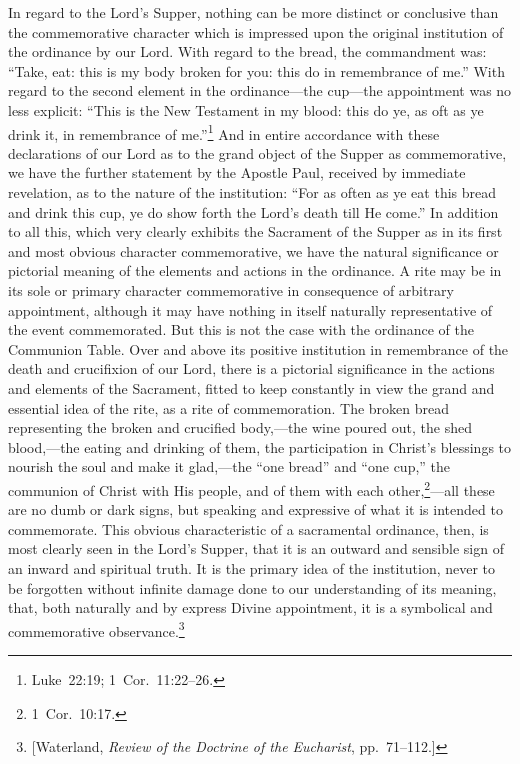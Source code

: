 \documentclass[
  english,
]{book}
\begin{document}
In regard to the Lord's Supper, nothing can be more distinct or conclusive than the commemorative character which is impressed upon the original institution of the ordinance by our Lord. With regard to the bread, the commandment was: ``Take, eat: this is my body broken for you: this do in remembrance of me.'' With regard to the second element in the ordinance---the cup---the appointment was no less explicit: ``This is the New Testament in my blood: this do ye, as oft as ye drink it, in remembrance of me.''\footnote{Luke~22:19; 1~Cor.~11:22--26.} And in entire accordance with these declarations of our Lord as to the grand object of the Supper as commemorative, we have the further statement by the Apostle Paul, received by immediate revelation, as to the nature of the institution: ``For as often as ye eat this bread and drink this cup, ye do show forth the Lord's death till He come.'' In addition to all this, which very clearly exhibits the Sacrament of the Supper as in its first and most obvious character commemorative, we have the natural significance or pictorial meaning of the elements and actions in the ordinance. A rite may be in its sole or primary character commemorative in consequence of arbitrary appointment, although it may have nothing in itself naturally representative of the event commemorated. But this is not the case with the ordinance of the Communion Table. Over and above its positive institution in remembrance of the death and crucifixion of our Lord, there is a pictorial significance in the actions and elements of the Sacrament, fitted to keep constantly in view the grand and essential idea of the rite, as a rite of commemoration. The broken bread representing the broken and crucified body,---the wine poured out, the shed blood,---the eating and drinking of them, the participation in Christ's blessings to nourish the soul and make it glad,---the ``one bread'' and ``one cup,'' the communion of Christ with His people, and of them with each other,\footnote{1~Cor.~10:17.}---all these are no dumb or dark signs, but speaking and expressive of what it is intended to commemorate. This obvious characteristic of a sacramental ordinance, then, is most clearly seen in the Lord's Supper, that it is an outward and sensible sign of an inward and spiritual truth. It is the primary idea of the institution, never to be forgotten without infinite damage done to our understanding of its meaning, that, both naturally and by express Divine appointment, it is a symbolical and commemorative observance.\footnote{{[}Waterland, \emph{Review of the Doctrine of the Eucharist}, pp.~71--112.{]}}
\end{document}
